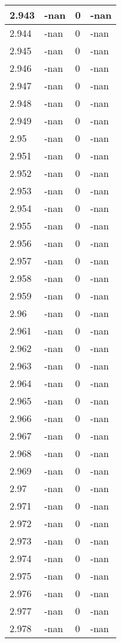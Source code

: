 \documentclass[a4paper,14pt]{extarticle}
\begin{document}
\begin{longtable}{||m{3cm}||m{3cm}|m{3cm}||m{3cm}||}
\hline
2.943 & -nan & 0 & -nan\\
\hline
2.944 & -nan & 0 & -nan\\
\hline
2.945 & -nan & 0 & -nan\\
\hline
2.946 & -nan & 0 & -nan\\
\hline
2.947 & -nan & 0 & -nan\\
\hline
2.948 & -nan & 0 & -nan\\
\hline
2.949 & -nan & 0 & -nan\\
\hline
2.95 & -nan & 0 & -nan\\
\hline
2.951 & -nan & 0 & -nan\\
\hline
2.952 & -nan & 0 & -nan\\
\hline
2.953 & -nan & 0 & -nan\\
\hline
2.954 & -nan & 0 & -nan\\
\hline
2.955 & -nan & 0 & -nan\\
\hline
2.956 & -nan & 0 & -nan\\
\hline
2.957 & -nan & 0 & -nan\\
\hline
2.958 & -nan & 0 & -nan\\
\hline
2.959 & -nan & 0 & -nan\\
\hline
2.96 & -nan & 0 & -nan\\
\hline
2.961 & -nan & 0 & -nan\\
\hline
2.962 & -nan & 0 & -nan\\
\hline
2.963 & -nan & 0 & -nan\\
\hline
2.964 & -nan & 0 & -nan\\
\hline
2.965 & -nan & 0 & -nan\\
\hline
2.966 & -nan & 0 & -nan\\
\hline
2.967 & -nan & 0 & -nan\\
\hline
2.968 & -nan & 0 & -nan\\
\hline
2.969 & -nan & 0 & -nan\\
\hline
2.97 & -nan & 0 & -nan\\
\hline
2.971 & -nan & 0 & -nan\\
\hline
2.972 & -nan & 0 & -nan\\
\hline
2.973 & -nan & 0 & -nan\\
\hline
2.974 & -nan & 0 & -nan\\
\hline
2.975 & -nan & 0 & -nan\\
\hline
2.976 & -nan & 0 & -nan\\
\hline
2.977 & -nan & 0 & -nan\\
\hline
2.978 & -nan & 0 & -nan\\

\end{longtable}
\end{document}
